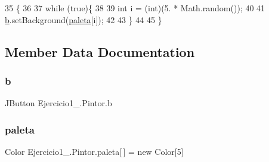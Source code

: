 \begin{DoxyCode}
35                      \{
36 
37           \textcolor{keywordflow}{while} (\textcolor{keyword}{true})\{
38 
39             \textcolor{keywordtype}{int} i = (int)(5. * Math.random());
40 
41             \mbox{\hyperlink{class_ejercicio1__3_1_1_pintor_a3025354dffadefccce6ca19ede04c171}{b}}.setBackground(\mbox{\hyperlink{class_ejercicio1__3_1_1_pintor_a0e0b6ca6f1510ec416a533e3d94a59e2}{paleta}}[i]);
42 
43         \}
44 
45     \}
\end{DoxyCode}


\subsection{Member Data Documentation}
\mbox{\label{class_ejercicio1__3_1_1_pintor_a3025354dffadefccce6ca19ede04c171}} 
\subsubsection{\texorpdfstring{b}{b}}
{\footnotesize\ttfamily J\+Button Ejercicio1\+\_.\+Pintor.\+b\hspace{0.3cm}{\ttfamily [package]}}

\mbox{\label{class_ejercicio1__3_1_1_pintor_a0e0b6ca6f1510ec416a533e3d94a59e2}} 
\subsubsection{\texorpdfstring{paleta}{paleta}}
{\footnotesize\ttfamily Color Ejercicio1\+\_.\+Pintor.\+paleta\mbox{[}$\,$\mbox{]} = new Color\mbox{[}5\mbox{]}\hspace{0.3cm}{\ttfamily [package]}}

